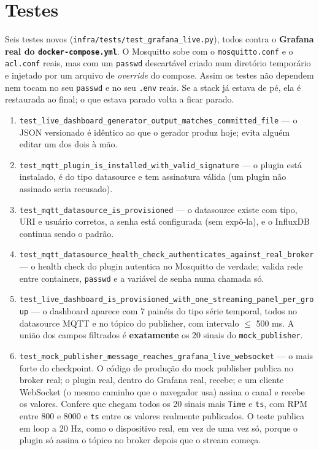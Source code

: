 \documentclass[11pt,a4paper]{article}
\begin{document}
\section{Testes}

Seis testes novos (\texttt{infra/tests/test\_grafana\_live.py}), todos contra o \textbf{Grafana real do \texttt{docker-compose.yml}}. O Mosquitto sobe com o \texttt{mosquitto.conf} e o \texttt{acl.conf} reais, mas com um \texttt{passwd} descartável criado num diretório temporário e injetado por um arquivo de \emph{override} do compose. Assim os testes não dependem nem tocam no seu \texttt{passwd} e no seu \texttt{.env} reais. Se a stack já estava de pé, ela é restaurada ao final; o que estava parado volta a ficar parado.

\begin{enumerate}[label=\textbf{Teste \arabic*}]
    \item \texttt{test\_live\_dashboard\_generator\_output\_matches\_committed\_file} --- o JSON versionado é idêntico ao que o gerador produz hoje; evita alguém editar um dos dois à mão.
    \item \texttt{test\_mqtt\_plugin\_is\_installed\_with\_valid\_signature} --- o plugin está instalado, é do tipo datasource e tem assinatura válida (um plugin não assinado seria recusado).
    \item \texttt{test\_mqtt\_datasource\_is\_provisioned} --- o datasource existe com tipo, URI e usuário corretos, a senha está configurada (sem expô-la), e o InfluxDB continua sendo o padrão.
    \item \texttt{test\_mqtt\_datasource\_health\_check\_authenticates\_against\_real\_broker} --- o health check do plugin autentica no Mosquitto de verdade; valida rede entre containers, \texttt{passwd} e a variável de senha numa chamada só.
    \item \texttt{test\_live\_dashboard\_is\_provisioned\_with\_one\_streaming\_panel\_per\_group} --- o dashboard aparece com 7 painéis do tipo série temporal, todos no datasource MQTT e no tópico do publisher, com intervalo $\leq$ 500 ms. A união dos campos filtrados é \textbf{exatamente} os 20 sinais do \texttt{mock\_publisher}.
    \item \texttt{test\_mock\_publisher\_message\_reaches\_grafana\_live\_websocket} --- o mais forte do checkpoint. O código de produção do mock publisher publica no broker real; o plugin real, dentro do Grafana real, recebe; e um cliente WebSocket (o mesmo caminho que o navegador usa) assina o canal e recebe os valores. Confere que chegam todos os 20 sinais mais \texttt{Time} e \texttt{ts}, com RPM entre 800 e 8000 e \texttt{ts} entre os valores realmente publicados. O teste publica em loop a 20 Hz, como o dispositivo real, em vez de uma vez só, porque o plugin só assina o tópico no broker depois que o stream começa.
\end{enumerate}
\end{document}
